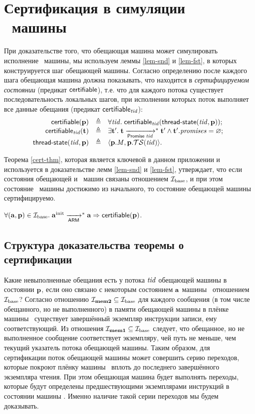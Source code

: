 \chapter{Сертификация в симуляции \ARMt~машины}
\label{sec:app:cert}

При доказательстве того, что обещающая машина может симулировать исполнение \ARMt~машины,
мы используем леммы \ref{lem-snd} и \ref{lem-fst}, в которых конструируется шаг обещающей машины.
Согласно определению после каждого шага обещающая машина должна показывать, что находится в \emph{сертифицируемом состоянии}
(предикат $\mathsf{certifiable}$), т.е. что для каждого потока существует последовательность
локальных шагов, при исполнении которых поток
выполняет все данные обещания (предикат $\mathsf{certifiable}_{\mathit{tid}}$):
\[\begin{array}{r l l}
\mathsf{certifiable}(\mathbf{p}) & \triangleq & \forall \mathit{tid}. \; \mathsf{certifiable}_{\mathit{tid}}(\textup{\sf thread-state}(\mathit{tid},\mathbf{p})); \\
\mathsf{certifiable}_{\mathit{tid}}(\mathbf{t}) & \triangleq & \exists \mathbf{t}'. \; \mathbf{t} \xrightarrow[\mathsf{Promise} \; \mathit{tid}]{}^{*} \mathbf{t}' \land \mathbf{t}'.\mathit{promises} = \varnothing; \\
\textup{\sf thread-state}(\mathit{tid}, \mathbf{p}) & \triangleq & \langle \mathbf{p}.\mathit{M}, \mathbf{p}.\mathcal{TS}(\mathit{tid}) \rangle. \\
\end{array}\]

Теорема \ref{cert-thm}, которая является ключевой в данном приложении и используется в доказательстве
лемм \ref{lem-snd} и \ref{lem-fst}, утверждает,
что если состояния обещающей и \ARMt~машин связаны отношением $\mathcal{I}_{\textup{\rm base}}$, и при этом состояние \ARMt~машины
достижимо из начального, то состояние обещающей машины сертифицируемо.
\begin{theorem}
\label{cert-thm}
$\forall (\mathbf{a}, \mathbf{p}) \in \mathcal{I}_{\textup{\rm base}}. \; \mathbf{a}^{\rm init} \xrightarrow[\mathsf{ARM}]{}^{*} \mathbf{a} \Rightarrow \mathsf{certifiable}(\mathbf{p})$.
\end{theorem}

\section{Структура доказательства теоремы о сертификации}

Какие невыполненные обещания есть у потока $\mathit{tid}$ обещающей машины в состоянии $\mathbf{p}$,
если оно связано с некоторым состоянием $\mathbf{a}$ машины \ARMt~отношением $\mathcal{I}_{\textup{\rm base}}$?
Согласно отношению $\mathcal{I}_{\rm \bf mem2} \subseteq \mathcal{I}_{\textup{\rm base}}$ для каждого сообщения
(в том числе обещанного, но не выполненного) в памяти обещающей машины
в плёнке машины \ARMt~существует завершённый экземпляр инструкции записи, ему
соответствующий. Из отношения $\mathcal{I}_{\rm \bf mem1} \subseteq \mathcal{I}_{\textup{\rm base}}$ следует, что
обещанное, но не выполненное сообщение соответствует экземпляру, чей путь не меньше,
чем текущий указатель потока обещающей машины.
Таким образом, для сертификации поток обещающей машины может совершить серию переходов,
которые покроют плёнку машины \ARMt~вплоть до последнего завершённого экземпляра чтения.
При этом обещающая машина будет выполнять переходы, которые будут определены предшествующими
экземплярами инструкций в состоянии машины \ARMt.
Именно наличие такой серии переходов мы будем доказывать.

